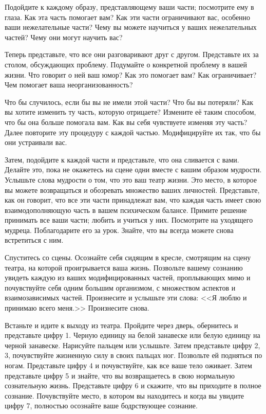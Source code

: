 \documentclass[10pt, fleqn]{article}
\begin{document}
Подойдите к каждому образу, представляющему ваши части; посмотрите ему в глаза. Как эта часть помогает вам? Как эти части ограничивают вас, особенно ваши нежелательные части? Чему вы можете научиться у ваших нежелательных частей? Чему они могут научить вас?

Теперь представьте, что все они разговаривают друг с другом. Представьте их за столом, обсуждающих проблему. Подумайте о конкретной проблему в вашей жизни. Что говорит о ней ваш юмор? Как это помогает вам? Как ограничивает? Чем помогает ваша неорганизованность?

Что бы случилось, если бы вы не имели этой части? Что бы вы потеряли? Как вы хотите изменить ту часть, которую отрицаете? Измените её таким способом, что бы она больше помогала вам. Как вы себя чувствуете изменяя эту часть? Далее повторите эту процедуру с каждой частью. Модифицируйте их так, что бы они устраивали вас.

Затем, подойдите к каждой части и представьте, что она сливается с вами. Делайте это, пока не окажетесь на сцене одни вместе с вашим образом мудрости. Услышьте слова мудрости о том, что это ваш театр жизни. Это место, в которое вы можете возвращаться и обозревать множество ваших личностей. Представьте, как он говорит, что все эти части принадлежат вам, что каждая часть имеет свою взаимодополняющую часть в вашем психическом балансе. Примите решение принимать все ваши части; любить и учиться у них. Посмотрите на уходящего мудреца. Поблагодарите его за урок. Знайте, что вы всегда можете снова встретиться с ним.

Спуститесь со сцены. Осознайте себя сидящим в кресле, смотрящим на сцену театра, на которой проигрывается ваша жизнь. Позвольте вашему сознанию увидеть каждую из ваших модифицированных частей, проплывающих мимо и почувствуйте себя одним большим организмом, с множеством аспектов и взаимозависимых частей. Произнесите и услышьте эти слова: <<Я люблю и принимаю всего меня.>> Произнесите снова.

Встаньте и идите к выходу из театра. Пройдите через дверь, обернитесь и представьте цифру 1. Черную единицу на белой занавеске или белую единицу на черной занавеске. Нарисуйте пальцем или услышьте. Затем представьте цифру 2, 3, почувствуйте жизненную силу в своих пальцах ног. Позвольте ей подняться по ногам. Представьте цифру 4 и почувствуйте, как все ваше тело оживает. Затем представьте цифру 5 и знайте, что вы возвращаетесь в свою нормальную сознательную жизнь. Представьте цифру 6 и скажите, что вы приходите в полное сознание. Почувствуйте место, в котором вы находитесь и когда вы увидите цифру 7, полностью осознайте ваше бодрствующее сознание.
\end{document}
